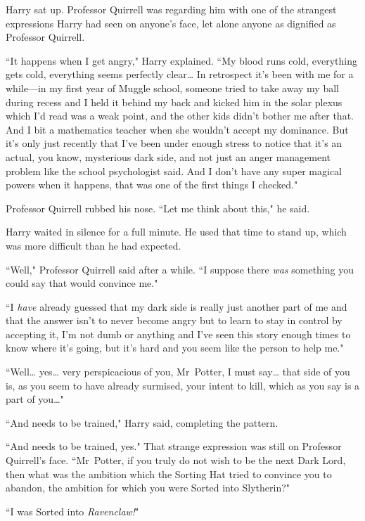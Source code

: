 Harry sat up. Professor Quirrell was regarding him with one of the strangest expressions Harry had seen on anyone's face, let alone anyone as dignified as Professor Quirrell.

``It happens when I get angry," Harry explained. ``My blood runs cold, everything gets cold, everything seems perfectly clear{\ldots} In retrospect it's been with me for a while—in my first year of Muggle school, someone tried to take away my ball during recess and I held it behind my back and kicked him in the solar plexus which I'd read was a weak point, and the other kids didn't bother me after that. And I bit a mathematics teacher when she wouldn't accept my dominance. But it's only just recently that I've been under enough stress to notice that it's an actual, you know, mysterious dark side, and not just an anger management problem like the school psychologist said. And I don't have any super magical powers when it happens, that was one of the first things I checked."

Professor Quirrell rubbed his nose. ``Let me think about this," he said.

Harry waited in silence for a full minute. He used that time to stand up, which was more difficult than he had expected.

``Well," Professor Quirrell said after a while. ``I suppose there \emph{was} something you could say that would convince me."

``I \emph{have} already guessed that my dark side is really just another part of me and that the answer isn't to never become angry but to learn to stay in control by accepting it, I'm not dumb or anything and I've seen this story enough times to know where it's going, but it's hard and you seem like the person to help me."

``Well{\ldots} yes{\ldots} very perspicacious of you, Mr~Potter, I must say{\ldots} that side of you is, as you seem to have already surmised, your intent to kill, which as you say is a part of you{\ldots}"

``And needs to be trained," Harry said, completing the pattern.

``And needs to be trained, yes." That strange expression was still on Professor Quirrell's face. ``Mr~Potter, if you truly do not wish to be the next Dark Lord, then what was the ambition which the Sorting Hat tried to convince you to abandon, the ambition for which you were Sorted into Slytherin?"

``I was Sorted into \emph{Ravenclaw!}"

